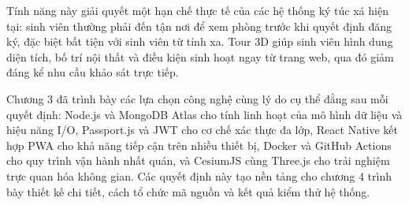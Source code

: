\documentclass[../DoAn.tex]{subfiles}
\begin{document}
Tính năng này giải quyết một hạn chế thực tế của các hệ thống ký túc xá hiện
tại: sinh viên thường phải đến tận nơi để xem phòng trước khi quyết định đăng
ký, đặc biệt bất tiện với sinh viên từ tỉnh xa. Tour 3D giúp sinh viên hình
dung diện tích, bố trí nội thất và điều kiện sinh hoạt ngay từ trang web, qua
đó giảm đáng kể nhu cầu khảo sát trực tiếp.

Chương 3 đã trình bày các lựa chọn công nghệ cùng lý do cụ thể đằng sau mỗi
quyết định: Node.js và MongoDB Atlas cho tính linh hoạt của mô hình dữ liệu và
hiệu năng I/O, Passport.js và JWT cho cơ chế xác thực đa lớp, React Native kết
hợp PWA cho khả năng tiếp cận trên nhiều thiết bị, Docker và GitHub Actions cho
quy trình vận hành nhất quán, và CesiumJS cùng Three.js cho trải nghiệm trực
quan hóa không gian. Các quyết định này tạo nền tảng cho chương 4 trình bày
thiết kế chi tiết, cách tổ chức mã nguồn và kết quả kiểm thử hệ thống.
\end{document}

